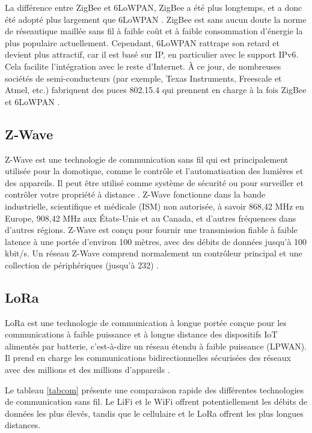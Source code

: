 La différence entre ZigBee et 6LoWPAN, ZigBee a été plus longtemps, et a donc été adopté plus largement que 6LoWPAN \cite{lu2011interconnecting}. ZigBee est sans aucun doute la norme de réseautique maillée sans fil à faible coût et à faible consommation d'énergie la plus populaire actuellement. Cependant, 6LoWPAN rattrape son retard et devient plus attractif, car il est basé sur IP, en particulier avec le support IPv6. Cela facilite l'intégration avec le reste d'Internet. À ce jour, de nombreuses sociétés de semi-conducteurs (par exemple, Texas Instruments, Freescale et Atmel, etc.) fabriquent des puces 802.15.4 qui prennent en charge à la fois ZigBee et 6LoWPAN \cite{drake2014zigbee}.
\subsection{Z‐Wave}
Z-Wave est une technologie de communication sans fil qui est principalement utilisée pour la domotique, comme le contrôle et l'automatisation des lumières et des appareils. Il peut être utilisé comme système de sécurité ou pour surveiller et contrôler votre propriété à distance \cite{unwala2018iot}. Z-Wave fonctionne dans la bande industrielle, scientifique et médicale (ISM) non autorisée, à savoir 868,42 MHz en Europe, 908,42 MHz aux États-Unis et au Canada, et d'autres fréquences dans d'autres régions. Z-Wave est conçu pour fournir une transmission fiable à faible latence à une portée d'environ 100 mètres, avec des débits de données jusqu'à 100 kbit/s. Un réseau Z-Wave comprend normalement un contrôleur principal et une collection de périphériques (jusqu'à 232) \cite{unwala2017iot}.

\subsection{LoRa}

LoRa est une technologie de communication à longue portée conçue pour les communications à faible puissance et à longue distance des dispositifs IoT alimentés par batterie, c'est-à-dire un réseau étendu à faible puissance (LPWAN). Il prend en charge les communications bidirectionnelles sécurisées des réseaux avec des millions et des millions d'appareils \cite{vangelista2015long,vejlgaard2017coverage}.


Le tableau \ref{tabcom}  présente une comparaison rapide des différentes technologies de communication sans fil. Le LiFi et le WiFi offrent potentiellement les débits de données les plus élevés, tandis que le cellulaire et le LoRa offrent les plus longues distances.

